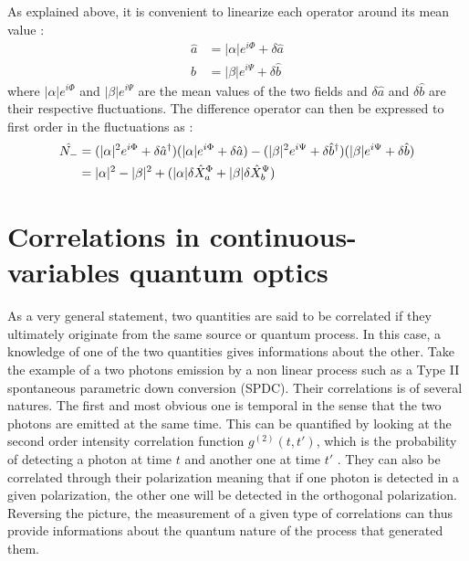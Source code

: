As explained above, it is convenient to linearize each operator around its mean value :
\begin{equation}
    \begin{aligned}
    \hat{a} &= |\alpha|e^{i\Phi} + \delta \hat{a} \\
    \hat{b} &= |\beta|e^{i\Psi} + \delta \hat{b}
    \end{aligned}
\end{equation}
where $|\alpha|e^{i\Phi}$ and $|\beta|e^{i\Psi}$ are the mean values of the two fields and $\delta \hat{a}$ and $\delta \hat{b}$ are their respective fluctuations.
The difference operator can then be expressed to first order in the fluctuations as :
\begin{equation}
    \label{eq:diff_op2}
    \begin{aligned}
    \hat{N_-} &= (|\alpha|^2e^{i\Phi}+\delta \hat{a}^\dagger)(|\alpha|e^{i\Phi}+\delta \hat{a}) - (|\beta|^2e^{i\Psi}+\delta \hat{b}^\dagger)(|\beta|e^{i\Psi}+\delta \hat{b}) \\
    &= |\alpha|^2 - |\beta|^2 +(|\alpha|\delta \hat{X}_a^\Phi + |\beta|\delta \hat{X}_b^\Psi) 
    \end{aligned}
\end{equation}



\section{Correlations in continuous-variables quantum optics}
\label{sec:corr_cv}
As a very general statement, two quantities are said to be correlated if they ultimately originate from the same source or quantum process. In this case, a knowledge of one of the two quantities gives informations about the other.
Take the example of a two photons emission by a non linear process such as a Type II spontaneous parametric down conversion (SPDC). Their correlations is of several natures. The first and most obvious one is temporal in the sense that the two photons are emitted at the same time. This can be
quantified by looking at the second order intensity correlation function $g^{(2)}(t,t')$, which is the probability of detecting a photon at time $t$ and another one at time $t'$ \cite{hanbury_brown_twiss_1956}. They can also 
be correlated through their polarization meaning that if one photon is detected in a given polarization, the other one will be detected in the orthogonal polarization. Reversing the picture,
the measurement of a given type of correlations can thus provide informations about the quantum nature of the process that generated them.


